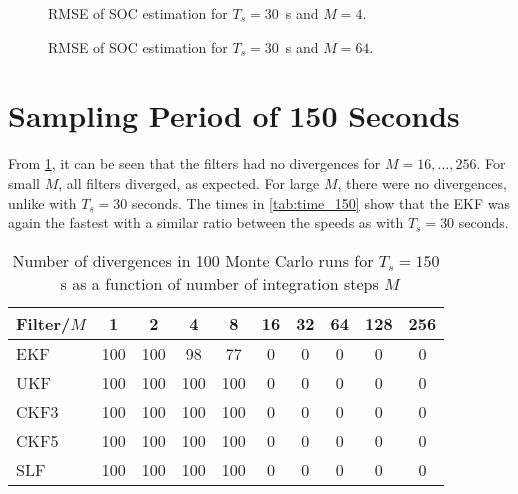 \documentclass[../zhang_thesis.tex]{subfiles}
\begin{document}
\begin{figure}[h]
\centering
%
\caption{RMSE of SOC estimation for $T_s=30$~s and $M=4$.}
\label{fig:rmse_30_4}
\end{figure}

\begin{figure}
\centering
%
\caption{RMSE of SOC estimation for $T_s=30$~s and $M=64$.}
\label{fig:rmse_30_64}
\end{figure}

\clearpage

\section{Sampling Period of 150 Seconds}

From \cref{tab:div_150}, it can be seen that the filters had no divergences for $M=16,\dots,256$. For small $M$, all filters diverged, as expected. For large $M$, there were no divergences, unlike with $T_s=30$ seconds. The times in \cref{tab:time_150} show that the EKF was again the fastest with a similar ratio between the speeds as with $T_s=30$ seconds. 

\begin{table}[h]
\centering
\caption{Number of divergences in 100 Monte Carlo runs for $T_s=150$~s as a function of number of integration steps $M$}
\begin{tabular}{@{}l*{9}{c}@{}}
\toprule
Filter/$M$ & 1   & 2   & 4   & 8   & 16 & 32 & 64 & 128 & 256 \\
\midrule
EKF        & 100 & 100 & 98  & 77  & 0  & 0  & 0  & 0   & 0   \\
UKF        & 100 & 100 & 100 & 100 & 0  & 0  & 0  & 0   & 0   \\
CKF3       & 100 & 100 & 100 & 100 & 0  & 0  & 0  & 0   & 0   \\
CKF5       & 100 & 100 & 100 & 100 & 0  & 0  & 0  & 0   & 0   \\
SLF        & 100 & 100 & 100 & 100 & 0  & 0  & 0  & 0   & 0   \\
\bottomrule
\end{tabular}
\label{tab:div_150}
\end{table}
\end{document}
